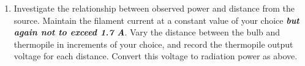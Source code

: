 \begin{enumerate}
\item \label{sec:PvsD}  Investigate the relationship between observed power and distance from the source.   Maintain the filament current at a constant value of your choice  {\bf \em but again not to exceed 1.7 A}.  Vary the distance between the bulb and thermopile in increments of your choice, and record the thermopile output voltage for each distance.   Convert this voltage to radiation power as above. 









\end{enumerate}
